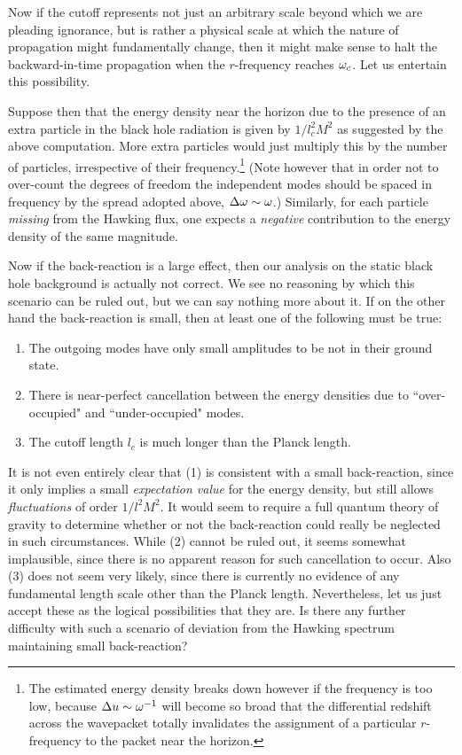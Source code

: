 Now if the cutoff represents not just an arbitrary scale
beyond which we are pleading ignorance, but is rather a
physical scale at which the nature of propagation might
fundamentally change, then it might make sense to halt the
backward-in-time propagation when the $r$-frequency reaches
$\omega_c$. Let us entertain this possibility.

Suppose then that the energy density near the horizon due to
the presence of an extra particle in the black hole
radiation is given by $1/l_c^2M^2$ as suggested by the
above computation. More extra particles would just multiply
this by the number of particles, irrespective of their
frequency.\footnote{The estimated energy density breaks down
however if the frequency is too low, because $\Delta u\sim
\omega^{-1}$ will become so broad that the differential redshift
across the wavepacket totally invalidates the assignment of
a particular $r$-frequency to the packet near the horizon.}
(Note however that in order not to over-count
the degrees of freedom the independent modes should be spaced in
frequency by the spread adopted above, $\Delta\omega\sim\omega$.)
Similarly, for each particle {\it missing} from the Hawking
flux, one expects a {\it negative} contribution to the
energy density of the same magnitude.

Now if the back-reaction is a large effect, then our
analysis on the static black hole background is actually not
correct. We see no reasoning by which this scenario can be
ruled out, but we can say nothing more about it.
If on the other hand the back-reaction is small, then at least one of the
following must be true:
\begin{enumerate}
\item The outgoing modes have only small amplitudes to
be not in their ground state.
\item There is near-perfect cancellation between the
energy densities due to ``over-occupied" and
``under-occupied" modes.
\item The cutoff length $l_c$ is much longer than the
Planck length.
\end{enumerate}

It is not even entirely clear that (1) is consistent with a small
back-reaction, since it only implies a small {\it expectation
value} for the energy density, but still allows {\it
fluctuations} of order $1/l^2M^2$. It would seem to require
a full quantum theory of gravity to determine whether or not the
back-reaction could really be neglected in such circumstances.
While (2) cannot be ruled out, it seems somewhat implausible,
since there is no apparent reason for such cancellation to
occur. Also (3) does not seem very likely,
since there is currently no evidence of any
fundamental length scale other than the Planck length.
Nevertheless, let us just accept
these as the logical possibilities that they are. Is there
any further difficulty with such a scenario of deviation
from the Hawking spectrum maintaining small back-reaction?

